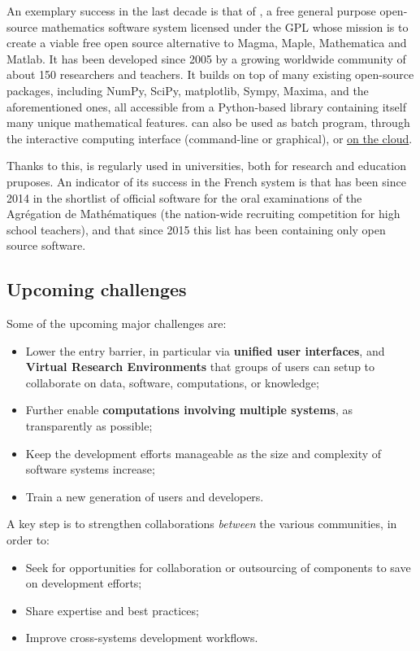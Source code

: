 \documentclass[12pt]{amsart}
\begin{document}
An exemplary success in the last decade is that of \Sage,
a free general purpose open-source mathematics
software system licensed under the GPL whose mission is to create a
viable free open source alternative to Magma, Maple, Mathematica and
Matlab. It has been developed since 2005 by a growing worldwide community of
about 150 researchers and teachers. It builds on top of many existing
open-source packages, including NumPy, SciPy, matplotlib, Sympy,
Maxima, and the aforementioned ones, all accessible from a
Python-based library containing itself many unique mathematical
features. \Sage can also be used as batch program, through the
\Jupyter interactive computing interface (command-line or graphical),
or \href{cloud.sagemath.org}{on the cloud}.

Thanks to this, \Sage is regularly used in universities, both for
research and education pruposes.  An indicator of its success in the French
system is that \Sage has been since 2014 in the shortlist of official
software for the oral examinations of the Agrégation de Mathématiques
(the nation-wide recruiting competition for high school teachers), and
that since 2015 this list has been containing only open source software.

\subsection{Upcoming challenges}

Some of the upcoming major challenges are:
\begin{itemize}
\item Lower the entry barrier, in particular via \textbf{unified user
    interfaces}, and \textbf{Virtual Research Environments} that
  groups of users can setup to collaborate on data, software,
  computations, or knowledge;
\item Further enable \textbf{computations involving multiple systems},
  as transparently as possible;
\item Keep the development efforts manageable as the size and
  complexity of software systems increase;
\item Train a new generation of users and developers.
\end{itemize}

A key step is to strengthen collaborations \emph{between} the various
communities, in order to:
\begin{itemize}
\item Seek for opportunities for collaboration or outsourcing of
  components to save on development efforts;
\item Share expertise and best practices;
\item Improve cross-systems development workflows.
\end{itemize}
\end{document}
